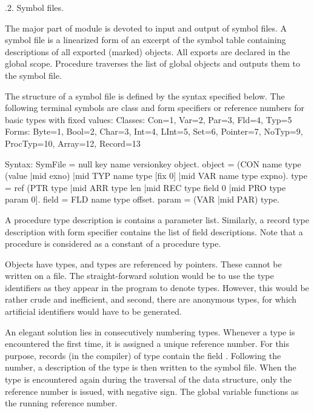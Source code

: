 .2. Symbol files.

The major part of module  is devoted to input and output of symbol files. A symbol file is a linearized form of an excerpt of the symbol table containing descriptions of all exported (marked) objects. All exports are declared in the global scope. Procedure  traverses the list of global objects and outputs them to the symbol file.

The structure of a symbol file is defined by the syntax specified below. The following terminal symbols are class and form specifiers or reference numbers for basic types with fixed values:
\begintt
Classes: Con=1, Var=2, Par=3, Fld=4, Typ=5
Forms: Byte=1, Bool=2, Char=3, Int=4, LInt=5, Set=6,
       Pointer=7, NoTyp=9, ProcTyp=10, Array=12, Record=13
\endtt

\noindent Syntax:
\begintt
SymFile = null key name versionkey {object}.
object = (CON name type (value |mid exno) |mid
          TYP name type [{fix} 0] |mid
          VAR name type expno).
type = ref (PTR type |mid
            ARR type len |mid
            REC type {field} 0 |mid
            PRO type {param} 0].
field = FLD name type offset.
param = (VAR |mid PAR) type.
\endtt

\noindent A procedure type description is contains a parameter list. Similarly, a record type description with form specifier  contains the list of field descriptions. Note that a procedure is considered as a constant of a procedure type.

Objects have types, and types are referenced by pointers. These cannot be written on a file. The straight-forward solution would be to use the type identifiers as they appear in the program to denote types. However, this would be rather crude and inefficient, and second, there are anonymous types, for which artificial identifiers would have to be generated.

An elegant solution lies in consecutively numbering types. Whenever a type is encountered the first time, it is assigned a unique reference number. For this purpose, records (in the compiler) of type  contain the field . Following the number, a description of the type is then written to the symbol file. When the type is encountered again during the traversal of the data structure, only the reference number is issued, with negative sign. The global variable  functions as the running reference number.

